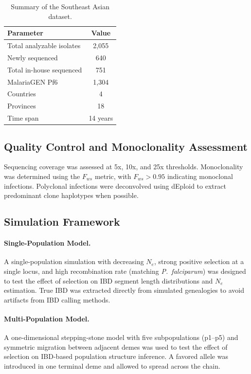 \documentclass[11pt]{article}
\begin{document}
\begin{table}[htbp]
\centering
\caption{Summary of the Southeast Asian dataset.}
\label{tab:dataset}
\begin{tabular}{lc}
\toprule
\textbf{Parameter} & \textbf{Value} \\
\midrule
Total analyzable isolates & 2,055 \\
Newly sequenced & 640 \\
Total in-house sequenced & 751 \\
MalariaGEN Pf6 & 1,304 \\
Countries & 4 \\
Provinces & 18 \\
Time span & 14 years \\
\bottomrule
\end{tabular}
\end{table}

\subsection{Quality Control and Monoclonality Assessment}

Sequencing coverage was assessed at 5x, 10x, and 25x thresholds. Monoclonality was determined using the $F_{ws}$ metric, with $F_{ws} > 0.95$ indicating monoclonal infections. Polyclonal infections were deconvolved using dEploid \citep{zhu2019deploid} to extract predominant clone haplotypes when possible.

\subsection{Simulation Framework}

\paragraph{Single-Population Model.} A single-population simulation with decreasing $N_e$, strong positive selection at a single locus, and high recombination rate (matching \textit{P.~falciparum}) was designed to test the effect of selection on IBD segment length distributions and $N_e$ estimation. True IBD was extracted directly from simulated genealogies to avoid artifacts from IBD calling methods.

\paragraph{Multi-Population Model.} A one-dimensional stepping-stone model with five subpopulations (p1--p5) and symmetric migration between adjacent demes was used to test the effect of selection on IBD-based population structure inference. A favored allele was introduced in one terminal deme and allowed to spread across the chain.
\end{document}
